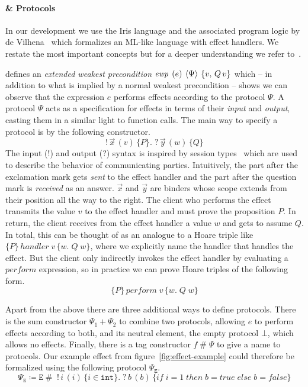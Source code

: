 \paragraph{\hazel{} \& Protocols}
In our development we use the Iris language \hh{} and the associated program logic \hazel{} by de Vilhena~\cite{de2022proof,de2021separation} which formalizes an ML-like language with effect handlers.
We restate the most important concepts but for a deeper understanding we refer to~\cite{de2021separation}.

\hazel{} defines an \emph{extended weakest precondition} \(\ewp{e}{\Psi}{v,\, Q\, v}\) which -- in addition to what is implied by a normal weakest precondition --
shows we can observe that the expression \(e\) performs effects according to the protocol \(\Psi\).
A protocol \(\Psi\) acts as a specification for effects in terms of their \emph{input} and \emph{output}, casting them in a similar light to function calls.
The main way to specify a protocol is by the following constructor.
\[
    !\, \overrightarrow{x}\, (v)\, \{P\}.\; ?\, \overrightarrow{y}\, (w)\, \{Q\}
\]
The input (!) and output (?) syntax is inspired by session types~\cite{sestypes} which are used to describe the behavior of communicating parties.
Intuitively, the part after the exclamation mark gets \emph{sent} to the effect handler and the part after the question mark is \emph{received} as an answer.
\(\overrightarrow{x}\) and \(\overrightarrow{y}\) are binders whose scope extends from their position all the way to the right.
The client who performs the effect transmits the value \(v\) to the effect handler and must prove the proposition \(P\).
In return, the client receives from the effect handler a value \(w\) and gets to assume \(Q\).
In total, this can be thought of as an analogue to a Hoare triple like \(\{P\}\, handler\; v\, \{w.\; Q\; w\}\), where we explicitly name the handler that handles the effect.
But the client only indirectly invokes the effect handler by evaluating a \(\mathit{perform}\) expression, so in practice we can prove Hoare triples of the following form.
\[
    \{P\}\, \mathit{perform}\; v\, \{w.\; Q\; w\}
\]

Apart from the above there are three additional ways to define protocols.
There is the sum constructor \(\Psi_1 + \Psi_2\) to combine two protocols, allowing \(e\) to perform effects according to both, and its neutral element, the empty protocol \(\bot\),
which allows no effects.
Finally, there is a tag constructor \(f \mathop{\#} \Psi\) to give a name to protocols.
Our example effect  from figure~\ref{fig:effect-example} could therefore be formalized using the following protocol \(\Psi_\mathtt{E}\).
\[
    \Psi_\mathtt{E} \coloneq \mathtt{E} \mathop{\#}\; !\, i\, (i)\, \{ i \in \mathtt{int} \}.\; ?\, b\, (b)\, \{ \mathit{if}\; i = 1\; \mathit{then}\; b = true\; \mathit{else}\; b = false \}
\]

